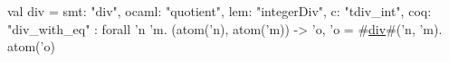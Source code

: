 val div = {
  smt: "div",
  ocaml: "quotient",
  lem: "integerDiv",
  c: "tdiv_int",
  coq: "div_with_eq"
} : forall 'n 'm. (atom('n), atom('m)) -> {'o, 'o = #\hyperref[zdiv]{div}#('n, 'm). atom('o)}
